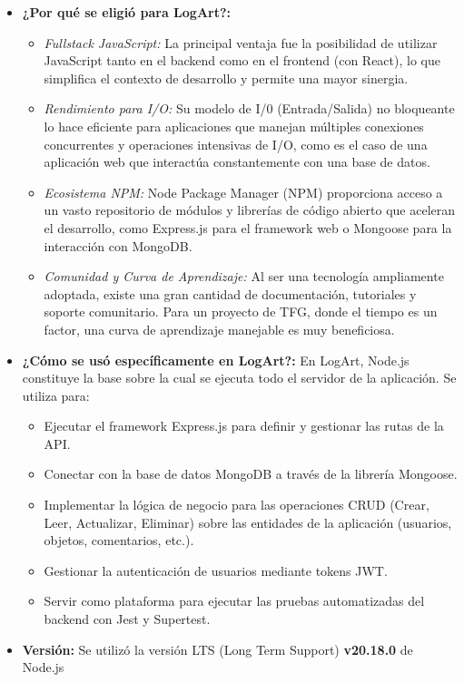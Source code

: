 \begin{itemize}
    \item \textbf{¿Por qué se eligió para LogArt?:}
        \begin{itemize}
            \item \textit{Fullstack JavaScript:} La principal ventaja fue la posibilidad de utilizar JavaScript tanto en el backend como en el frontend (con React), lo que simplifica el contexto de desarrollo y permite una mayor sinergia.
            \item \textit{Rendimiento para I/O:} Su modelo de I/0 (Entrada/Salida) no bloqueante lo hace eficiente para aplicaciones que manejan múltiples conexiones concurrentes y operaciones intensivas de I/O, como es el caso de una aplicación web que interactúa constantemente con una base de datos.
            \item \textit{Ecosistema NPM:} Node Package Manager (NPM) proporciona acceso a un vasto repositorio de módulos y librerías de código abierto que aceleran el desarrollo, como Express.js para el framework web o Mongoose para la interacción con MongoDB.
            \item \textit{Comunidad y Curva de Aprendizaje:} Al ser una tecnología ampliamente adoptada, existe una gran cantidad de documentación, tutoriales y soporte comunitario. Para un proyecto de TFG, donde el tiempo es un factor, una curva de aprendizaje manejable es muy beneficiosa.
        \end{itemize}
    \item \textbf{¿Cómo se usó específicamente en LogArt?:}
    En LogArt, Node.js constituye la base sobre la cual se ejecuta todo el servidor de la aplicación. Se utiliza para:
        \begin{itemize}
            \item Ejecutar el framework Express.js para definir y gestionar las rutas de la API.
            \item Conectar con la base de datos MongoDB a través de la librería Mongoose.
            \item Implementar la lógica de negocio para las operaciones CRUD (Crear, Leer, Actualizar, Eliminar) sobre las entidades de la aplicación (usuarios, objetos, comentarios, etc.).
            \item Gestionar la autenticación de usuarios mediante tokens JWT.
            \item Servir como plataforma para ejecutar las pruebas automatizadas del backend con Jest y Supertest.
        \end{itemize}
    \item \textbf{Versión:} Se utilizó la versión LTS (Long Term Support) \textbf{v20.18.0} de Node.js
\end{itemize}

